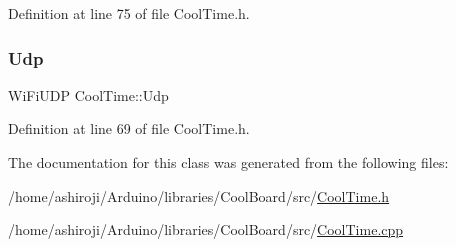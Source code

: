 Definition at line 75 of file Cool\+Time.\+h.

\mbox{\label{class_cool_time_a4e23216a8121ca79d0fb019f30884b92}} 
\subsubsection{\texorpdfstring{Udp}{Udp}}
{\footnotesize\ttfamily Wi\+Fi\+U\+DP Cool\+Time\+::\+Udp\hspace{0.3cm}{\ttfamily [private]}}



Definition at line 69 of file Cool\+Time.\+h.



The documentation for this class was generated from the following files\+:\begin{DoxyCompactItemize}
\item 
/home/ashiroji/\+Arduino/libraries/\+Cool\+Board/src/\hyperlink{_cool_time_8h}{Cool\+Time.\+h}\item 
/home/ashiroji/\+Arduino/libraries/\+Cool\+Board/src/\hyperlink{_cool_time_8cpp}{Cool\+Time.\+cpp}\end{DoxyCompactItemize}
